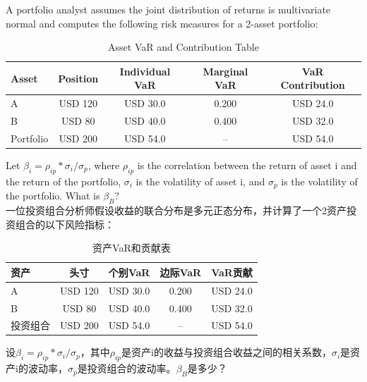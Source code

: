 \documentclass{article}
\newcounter{question} %
\begin{document}
\begin{question}
    A portfolio analyst assumes the joint distribution of returns is multivariate normal and computes the following risk measures for a 2-asset portfolio:

    \begin{table}[htbp]
        \centering
        \renewcommand{\arraystretch}{1.2}
        \begin{tabular}{|l|c|c|c|c|}
            \hline
            \textbf{Asset} & \textbf{Position} & \textbf{Individual VaR} & \textbf{Marginal VaR} & \textbf{VaR Contribution} \\
            \hline
            A & USD 120 & USD 30.0 & 0.200 & USD 24.0 \\
            B & USD 80 & USD 40.0 & 0.400 & USD 32.0 \\
            Portfolio & USD 200 & USD 54.0 & -- & USD 54.0 \\
            \hline
        \end{tabular}
        \caption{Asset VaR and Contribution Table}
    \end{table}

    Let $\beta_i = \rho_{ip}*\sigma_i/\sigma_p$, where $\rho_{ip}$ is the correlation between the return of asset i and the return of the portfolio, $\sigma_i$ is the volatility of asset i, and $\sigma_p$ is the volatility of the portfolio. What is $\beta_B$?
    \\一位投资组合分析师假设收益的联合分布是多元正态分布，并计算了一个2资产投资组合的以下风险指标：

    \begin{table}[htbp]
        \centering
        \renewcommand{\arraystretch}{1.2}
        \begin{tabular}{|l|c|c|c|c|}
            \hline
            \textbf{资产} & \textbf{头寸} & \textbf{个别VaR} & \textbf{边际VaR} & \textbf{VaR贡献} \\
            \hline
            A & USD 120 & USD 30.0 & 0.200 & USD 24.0 \\
            B & USD 80 & USD 40.0 & 0.400 & USD 32.0 \\
            投资组合 & USD 200 & USD 54.0 & -- & USD 54.0 \\
            \hline
        \end{tabular}
        \caption{资产VaR和贡献表}
    \end{table}

    设$\beta_i = \rho_{ip}*\sigma_i/\sigma_p$，其中$\rho_{ip}$是资产i的收益与投资组合收益之间的相关系数，$\sigma_i$是资产i的波动率，$\sigma_p$是投资组合的波动率。$\beta_B$是多少？
\end{question}
\end{document}

